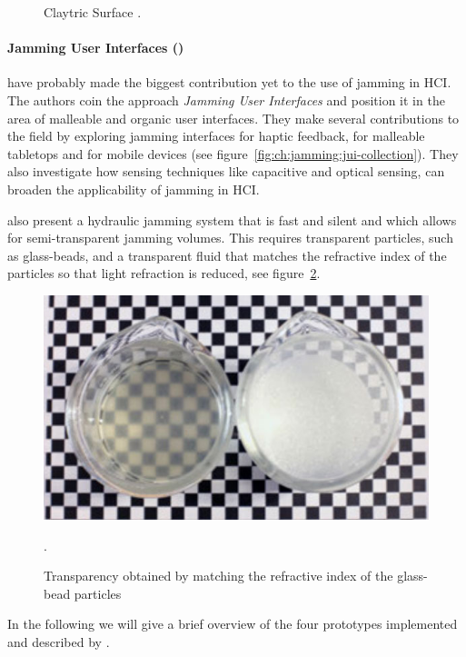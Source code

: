 \begin{figure}
\begin{minipage}[t]{.44\textwidth}
    \caption[Claytric Surface by \citet{matoba2012claytricsurface}.]
    {Claytric Surface \citep{matoba2012claytricsurface}.}
    \label{fig:ch:jamming:claytric-surface}
  \end{minipage}
\end{figure}

\paragraph{Jamming User Interfaces (\citeyear{follmer2012jamming})}
\label{ch:jamming:related-work:hci:jui} 
\citet{follmer2012jamming} have probably made the biggest contribution yet to the use of jamming in HCI. 
The authors coin the approach \textit{Jamming User Interfaces} and position it in the area of malleable and organic user interfaces. 
They make several contributions to the field by exploring jamming interfaces for haptic feedback, for malleable tabletops and for mobile devices (see figure~\ref{fig:ch:jamming:jui-collection}). 
They also investigate how sensing techniques like capacitive and optical sensing, can broaden the applicability of jamming in HCI. 

\citet{follmer2012jamming} also present a hydraulic jamming system that is fast and silent and which allows for semi-transparent jamming volumes. 
This requires transparent particles, such as glass-beads, and a transparent fluid that matches the refractive index of the particles so that light refraction is reduced, see figure~\ref{fig:ch:jamming:jui:refractive}. 

\begin{figure}[h]
  \centering
  \begin{minipage}[b]{.7\textwidth}
    \centering
    \includegraphics[width=.5\linewidth]{figures/jamming/refractive-index}
     \caption{Transparency obtained by matching the refractive index of the glass-bead particles \citep{follmer2012jamming}}.
    \label{fig:ch:jamming:jui:refractive}
  \end{minipage}
\end{figure}

In the following we will give a brief overview of the four prototypes implemented and described by \citet{follmer2012jamming}.

